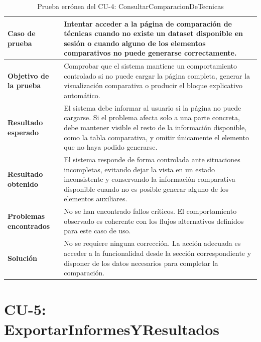 \begin{table}[H]
\centering
\small
\begin{tabularx}{\textwidth}{|p{}|X|}
\hline
\textbf{Caso de prueba} & Intentar acceder a la página de comparación de técnicas cuando no existe un dataset disponible en sesión o cuando alguno de los elementos comparativos no puede generarse correctamente. \\ \hline
\textbf{Objetivo de la prueba} & Comprobar que el sistema mantiene un comportamiento controlado si no puede cargar la página completa, generar la visualización comparativa o producir el bloque explicativo automático. \\ \hline
\textbf{Resultado esperado} & El sistema debe informar al usuario si la página no puede cargarse. Si el problema afecta solo a una parte concreta, debe mantener visible el resto de la información disponible, como la tabla comparativa, y omitir únicamente el elemento que no haya podido generarse. \\ \hline
\textbf{Resultado obtenido} & El sistema responde de forma controlada ante situaciones incompletas, evitando dejar la vista en un estado inconsistente y conservando la información comparativa disponible cuando no es posible generar alguno de los elementos auxiliares. \\ \hline
\textbf{Problemas encontrados} & No se han encontrado fallos críticos. El comportamiento observado es coherente con los flujos alternativos definidos para este caso de uso. \\ \hline
\textbf{Solución} & No se requiere ninguna corrección. La acción adecuada es acceder a la funcionalidad desde la sección correspondiente y disponer de los datos necesarios para completar la comparación. \\ \hline
\end{tabularx}
\caption{Prueba errónea del CU-4: ConsultarComparacionDeTecnicas}
\label{tab:prueba_erronea_cu4}
\normalsize
\end{table}

\Needspace{0.80\textheight}
\section{CU-5: ExportarInformesYResultados}


